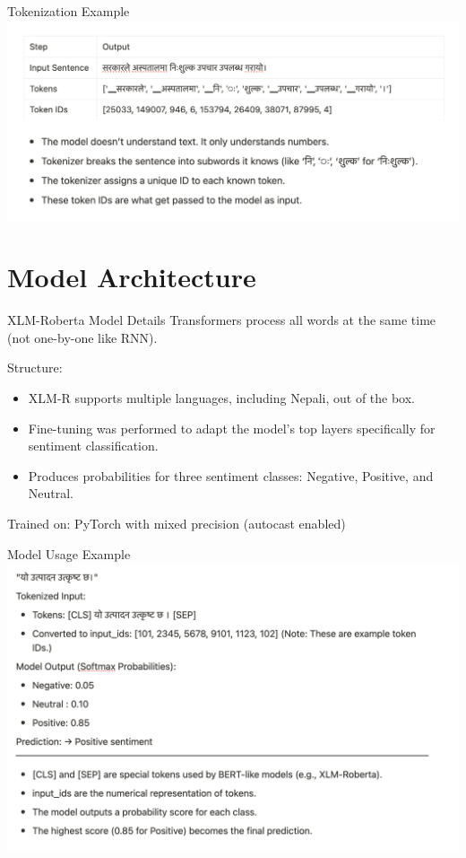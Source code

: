 \documentclass[aspectratio=169]{beamer}
\begin{document}
\begin{frame}{Tokenization Example}
  \centering
  \includegraphics[width=1\linewidth]{example.png}
\end{frame}

\section{Model Architecture}
\begin{frame}{XLM-Roberta Model Details}
  Transformers process all words at the same time (not one-by-one like RNN).

  Structure:
  \begin{itemize}
    \item XLM-R supports multiple languages, including Nepali, out of the box.
    \item Fine-tuning was performed to adapt the model's top layers specifically for sentiment classification.
    \item Produces probabilities for three sentiment classes: Negative, Positive, and Neutral.
  \end{itemize}

  Trained on: PyTorch with mixed precision (autocast enabled)
\end{frame}

\begin{frame}{Model Usage Example}
  \centering
  \includegraphics[width=0.65\linewidth]{example2.png}
\end{frame}
\end{document}
